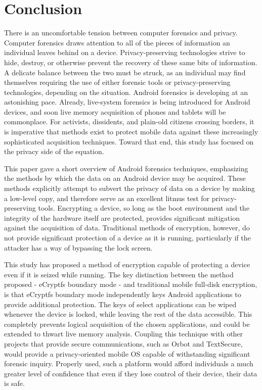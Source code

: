\chapter{Conclusion}

There is an uncomfortable tension between computer forensics and privacy. Computer forensics draws attention to all of the pieces of
information an individual leaves behind on a device.  Privacy-preserving technologies strive to hide, destroy, or otherwise prevent
the recovery of these same bits of information. A delicate balance between the two must be struck, as an individual may find
themselves requiring the use of either forensic tools or privacy-preserving technologies, depending on the situation. 
Android forensics is developing at an astonishing pace.  Already, live-system forensics is being introduced for Android devices, and
soon live memory acquisition of phones and tablets will be commonplace. For activists, dissidents, and plain-old citizens crossing
borders, it is imperative that methods exist to protect mobile data against these increasingly sophisticated acquisition techniques.
Toward that end, this study has focused on the privacy side of the equation.

This paper gave a short overview of Android forensics techniques, emphasizing the methods by which the data
on an Android device may be acquired. These methods explicitly attempt to subvert the privacy of data on a device by making a
low-level copy, and therefore serve as an excellent litmus test for privacy-preserving tools. Encrypting a device, so long as the
boot environment and the integrity of the hardware itself are protected, provides significant mitigation against the acquisition of
data. Traditional methods of encryption, however, do not provide significant protection of a device as it is running, particularly
if the attacker has a way of bypassing the lock screen.

This study has proposed a method of encryption capable of protecting a device even if it is seized while running.  The key
distinction between the method proposed - eCryptfs boundary mode - and traditional mobile full-disk encryption, is that eCryptfs
boundary mode independently keys Android applications to provide additional protection. The keys of select applications can be wiped
whenever the device is locked, while leaving the rest of the data accessible. This completely prevents logical acquisition of the
chosen applications, and could be extended to thwart live memory analysis. Coupling this technique with other projects
that provide secure communications, such as Orbot and TextSecure, would provide a privacy-oriented mobile OS capable of withstanding
significant forensic inquiry. Properly used, such a platform would afford individuals a much greater level of confidence that even
if they lose control of their device, their data is safe.
